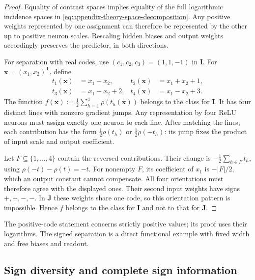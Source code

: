 \begin{proof}
    Equality of contrast spaces implies equality of the full
    logarithmic incidence spaces in
    \eqref{eq:appendix-theory-space-decomposition}.
    Any positive weights represented by one assignment can
    therefore be represented by the other up to positive neuron
    scales. Rescaling hidden biases and output weights
    accordingly preserves the predictor, in both directions.

    For separation with real codes, use
    $(c_1,c_2,c_3)=(1,1,-1)$ in $\mathbf I$.
    For $\mathbf x=(x_1,x_2)^{\mathsf T}$, define
    \begin{equation*}
        \begin{aligned}
            t_1(\mathbf x)&=x_1+x_2,&
            t_2(\mathbf x)&=x_1+x_2+1,\\
            t_3(\mathbf x)&=x_1-x_2+2,&
            t_4(\mathbf x)&=x_1-x_2+3.
        \end{aligned}
    \end{equation*}
    The function $f(\mathbf x):=\tfrac12\sum_{h=1}^4
    \rho(t_h(\mathbf x))$ belongs to the class for $\mathbf I$.
    It has four distinct lines with nonzero gradient jumps.
    Any representation by four ReLU neurons must assign exactly
    one neuron to each line. After matching the lines, each
    contribution has the form $\tfrac12\rho(t_h)$ or
    $\tfrac12\rho(-t_h)$: its jump fixes the product of
    input scale and output coefficient.

    Let $F\subseteq\{1,\ldots,4\}$ contain the reversed
    contributions. Their change is
    $-\tfrac12\sum_{h\in F}t_h$, using
    $\rho(-t)-\rho(t)=-t$.
    For nonempty $F$, its coefficient of $x_1$ is
    $-|F|/2$, which an output constant cannot compensate.
    All four orientations must therefore agree with the
    displayed ones. Their second input weights have signs
    $+,+,-,-$. In $\mathbf J$ these weights share one code,
    so this orientation pattern is impossible.
    Hence $f$ belongs to the class for $\mathbf I$ and not
    to that for $\mathbf J$.
\end{proof}

The positive-code statement concerns strictly positive values;
its proof uses their logarithms.
The signed separation is a direct functional example with fixed
width and free biases and readout.

\subsection{Sign diversity and complete sign information}
\label{app:theory-sign-details}
\label{app:theory-sign-proof}

